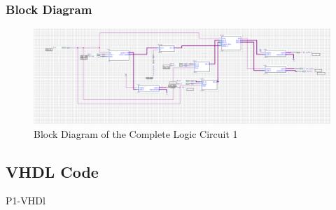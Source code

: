     \subsubsection{{Block Diagram}}

        \begin{figure}[H]
            \centering
            \includegraphics[width=15cm]{Pictures/P12BlockDia.png}
            \caption{{Block Diagram of the Complete Logic Circuit 1}}
            \label{FSM}
        \end{figure}

\subsection{{VHDL Code}}

    {P1-VHDl}
